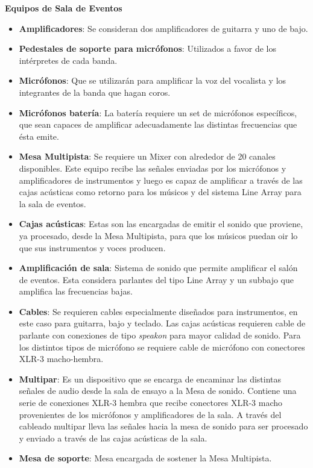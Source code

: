 \textbf{Equipos de Sala de Eventos}
\begin{itemize}
	\item \textbf{Amplificadores}: Se consideran dos amplificadores de guitarra
	      y uno de bajo.
	\item \textbf{Pedestales de soporte para micrófonos}: Utilizados a favor
         de los intérpretes de cada banda.
	\item \textbf{Micrófonos}: Que se utilizarán para amplificar
	      la voz del vocalista y los integrantes de la banda
	      que hagan coros.
	\item \textbf{Micrófonos batería}: La batería requiere un 
	      set de micrófonos específicos, que sean capaces
	      de amplificar adecuadamente las distintas 
	      frecuencias que ésta emite.
	\item \textbf{Mesa Multipista}: Se requiere un Mixer con 
	      alrededor de 20 canales disponibles. Este equipo
	      recibe las señales enviadas por los micrófonos y amplificadores
	      de instrumentos y luego es capaz de amplificar
	      a través de las cajas acústicas como retorno para los
	      músicos y del sistema Line Array para la sala de eventos.
	\item \textbf{Cajas acústicas}: Estas son las encargadas de emitir
	      el sonido que proviene, ya procesado, desde la Mesa
	      Multipista, para que los músicos puedan oir lo que
	      sus instrumentos y voces producen.
	\item \textbf{Amplificación de sala}: Sistema de sonido
	      que permite amplificar el salón de eventos. Esta considera
	      parlantes del tipo Line Array y un subbajo que amplifica las
	      frecuencias bajas.
	\item \textbf{Cables}: Se requieren cables especialmente diseñados
	      para instrumentos, en este caso para guitarra, bajo
	      y teclado. Las cajas acústicas requieren cable
	      de parlante con conexiones de tipo \textit{speakon}
	      para mayor calidad de sonido. Para los distintos
	      tipos de micrófono se requiere cable de micrófono
	      con conectores XLR-3 macho-hembra.
	\item \textbf{Multipar}: Es un dispositivo que se encarga de encaminar 
	      las distintas señales de audio desde la sala de ensayo
	      a la Mesa de sonido. Contiene una serie de conexiones XLR-3
	      hembra que recibe conectores XLR-3 macho provenientes
	      de los micrófonos y amplificadores de la sala. A través
	      del cableado multipar lleva las señales hacia la mesa de
	      sonido para ser procesado y enviado a través de las cajas
	      acústicas de la sala.
	\item \textbf{Mesa de soporte}: Mesa encargada de sostener la Mesa Multipista.
\end{itemize}

